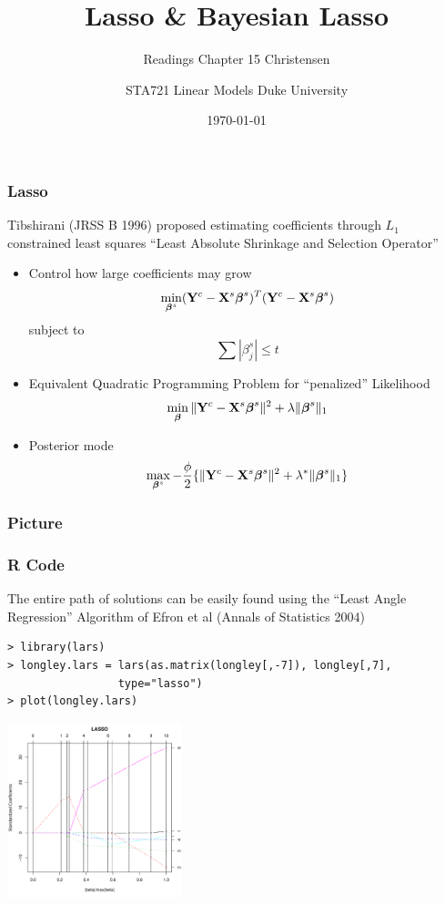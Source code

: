 \documentclass[]{beamer}
\title{Lasso \& Bayesian  Lasso }
\subtitle{Readings Chapter 15 Christensen}
\institute{Merlise Clyde}
\author{STA721 Linear Models Duke University}
\date{\today}
\begin{document}
\maketitle


\begin{frame}
  \frametitle{Lasso}
Tibshirani (JRSS B 1996) proposed estimating coefficients through
$L_1$ constrained least squares  ``Least Absolute Shrinkage and
Selection Operator''
\begin{itemize}
 \item Control how large coefficients may grow \pause
    $$\min_{\boldsymbol{\beta}^s} (\mathbf{Y}^c - \mathbf{X}^s \boldsymbol{\beta}^s)^T (\mathbf{Y}^c - \mathbf{X}^s\boldsymbol{\beta}^s)$$
    subject to
    $$ \sum |\beta^s_j| \le t$$ \pause
  \item Equivalent Quadratic Programming Problem for ``penalized'' Likelihood
    $$\min_{\boldsymbol{\beta}} \| \mathbf{Y}^c - \mathbf{X}^s \boldsymbol{\beta}^s\|^2 + \lambda \|\boldsymbol{\beta}^s\|_1$$ \pause
  \item Posterior mode
  $$
\max_{\boldsymbol{\beta}^s} -\frac{\phi}{2} \{ \| \mathbf{Y}^c - \mathbf{X}^s \boldsymbol{\beta}^s\|^2 + \lambda^* \|\boldsymbol{\beta}^s\|_1 \}
$$
\end{itemize}
\end{frame}
\begin{frame}
  \frametitle{Picture}

\end{frame}
\begin{frame}[fragile]
  \frametitle{R Code}
The entire path of solutions can be easily found using the
   ``Least Angle Regression'' Algorithm of Efron et al (Annals of
   Statistics 2004)
\begin{verbatim}
> library(lars)
> longley.lars = lars(as.matrix(longley[,-7]), longley[,7],
                 type="lasso")
> plot(longley.lars)
\end{verbatim}
\includegraphics[height=2in]{longley-lars}
\end{frame}
\end{document}

